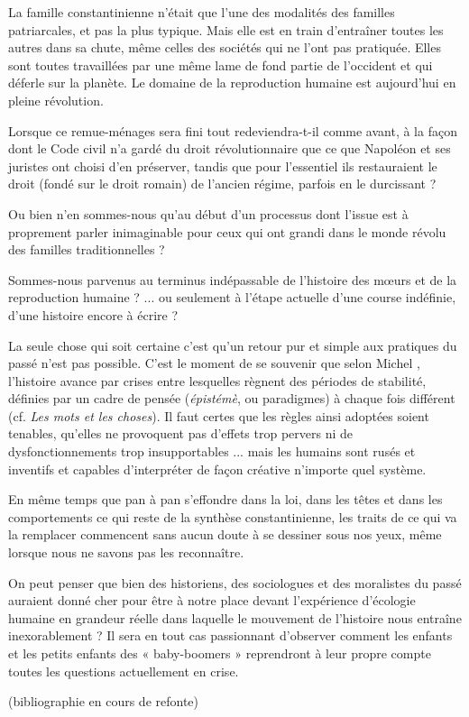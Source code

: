  La famille constantinienne n'était que l'une des modalités des familles patriarcales, et pas la plus typique. Mais elle est en train d'entraîner toutes les autres dans sa chute, même celles des sociétés qui ne l'ont pas pratiquée. Elles sont toutes travaillées par une même lame de fond partie de l'occident et qui déferle sur la planète. Le domaine de la reproduction humaine est aujourd'hui en pleine révolution.
  
 Lorsque ce remue-ménages sera fini tout redeviendra-t-il comme avant, à la façon dont le Code civil n'a gardé du droit révolutionnaire que ce que Napoléon et ses juristes ont choisi d'en préserver, tandis que pour l'essentiel ils restauraient le droit (fondé sur le droit romain) de l'ancien régime, parfois en le durcissant ? 
 
 Ou bien n'en sommes-nous qu'au début d'un processus dont l'issue est à proprement parler inimaginable pour ceux qui ont grandi dans le monde révolu des familles traditionnelles ?

 Sommes-nous parvenus au terminus indépassable de l'histoire des mœurs et de la reproduction humaine ? ... ou seulement à l'étape actuelle d'une course indéfinie, d'une histoire encore à écrire ? 
 
 La seule chose qui soit certaine c'est qu'un retour pur et simple aux pratiques du passé n'est pas possible. C'est le moment de se souvenir que selon Michel , l'histoire avance par crises entre lesquelles règnent des périodes de stabilité, définies par un cadre de pensée (\emph{épistémè}, ou paradigmes) à chaque fois différent (cf. \emph{Les mots et les choses}). Il faut certes que les règles ainsi adoptées soient tenables, qu'elles ne provoquent pas d'effets trop pervers ni de dysfonctionnements trop insupportables ... mais les humains sont rusés et inventifs et capables d'interpréter de façon créative n'importe quel système.

 En même temps que pan à pan s'effondre dans la loi, dans les têtes et dans les comportements ce qui reste de la synthèse constantinienne, les traits de ce qui va la remplacer commencent sans aucun doute à se dessiner sous nos yeux, même lorsque nous ne savons pas les reconnaître.

On peut penser que bien des historiens, des sociologues et des moralistes du passé auraient donné cher pour être à notre place devant l'expérience d'écologie humaine en grandeur réelle dans laquelle le mouvement de l'histoire nous entraîne inexorablement ? Il sera en tout cas passionnant d'observer comment les enfants et les petits enfants des « baby-boomers » reprendront à leur propre compte toutes les questions actuellement en crise.


(bibliographie en cours de refonte)


